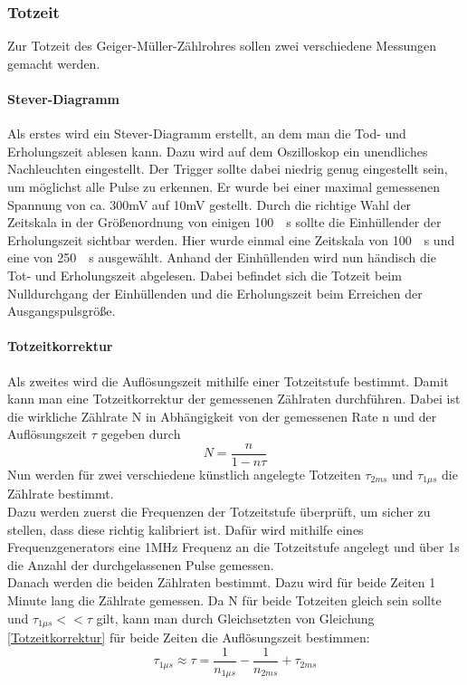 \documentclass[12pt,a4paper]{article}
\begin{document}
\subsubsection{Totzeit}
Zur Totzeit des Geiger-Müller-Zählrohres sollen zwei verschiedene Messungen gemacht werden.
\paragraph{Stever-Diagramm}
Als erstes wird ein Stever-Diagramm erstellt, an dem man die Tod- und Erholungszeit ablesen kann. Dazu wird auf dem Oszilloskop ein unendliches Nachleuchten eingestellt. Der Trigger sollte dabei niedrig genug eingestellt sein, um möglichst alle Pulse zu erkennen. Er wurde bei einer maximal gemessenen Spannung von ca. 300mV auf 10mV gestellt. Durch die richtige Wahl der Zeitskala in der Größenordnung von einigen \SI{100}{\mu s} sollte die Einhüllender der Erholungszeit sichtbar werden. Hier wurde einmal eine Zeitskala von \SI{100}{\mu s} und eine von \SI{250}{\mu s} ausgewählt. Anhand der Einhüllenden wird nun händisch die Tot- und Erholungszeit abgelesen. Dabei befindet sich die Totzeit beim Nulldurchgang der Einhüllenden und die Erholungszeit beim Erreichen der Ausgangspulsgröße. 

\paragraph{Totzeitkorrektur}
Als zweites wird die Auflösungszeit mithilfe einer Totzeitstufe bestimmt. Damit kann man eine Totzeitkorrektur der gemessenen Zählraten durchführen. Dabei ist die wirkliche Zählrate N in Abhängigkeit von der gemessenen Rate n und der Auflösungszeit $\tau$ gegeben durch 
\begin{equation}
\label{Totzeitkorrektur}
N = \dfrac{n}{1-n\tau}
\end{equation}
Nun werden für zwei verschiedene künstlich angelegte Totzeiten $\tau_{2ms}$ und $\tau_{1\mu s}$ die Zählrate bestimmt.\\Dazu werden zuerst die Frequenzen der Totzeitstufe überprüft, um sicher zu stellen, dass diese richtig kalibriert ist. Dafür wird mithilfe eines Frequenzgenerators eine 1MHz Frequenz an die Totzeitstufe angelegt und über 1s die Anzahl der durchgelassenen Pulse gemessen.\\
Danach werden die beiden Zählraten bestimmt. Dazu wird für beide Zeiten 1 Minute lang die Zählrate gemessen. Da N für beide Totzeiten gleich sein sollte und $\tau_{1\mu s} << \tau$ gilt, kann man durch Gleichsetzten von Gleichung \ref{Totzeitkorrektur} für beide Zeiten die Auflösungszeit bestimmen:
\begin{equation}
\tau_{1\mu s} \approx \tau = \dfrac{1}{n_{1\mu s}} - \dfrac{1}{n_{2ms}} + \tau_{2ms}
\label{Auslosungszeit}
\end{equation}
\end{document}
